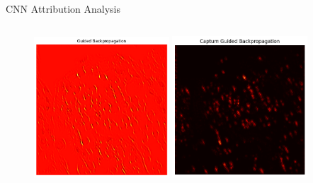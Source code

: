 \documentclass[aspectratio=169,8pt]{beamer}  %
\begin{document}
\begin{frame}{CNN Attribution Analysis}
\begin{columns}[T]
\begin{column}{0.5\textwidth}
\begin{figure}
\includegraphics[width=0.45\textwidth]{imgs/cnn_gbp.png}
\vspace{0.2cm}
\includegraphics[width=0.45\textwidth]{imgs/cnn_gbp_captum.png}
\end{figure}
\end{column}
\end{columns}
\end{frame}
\end{document}
